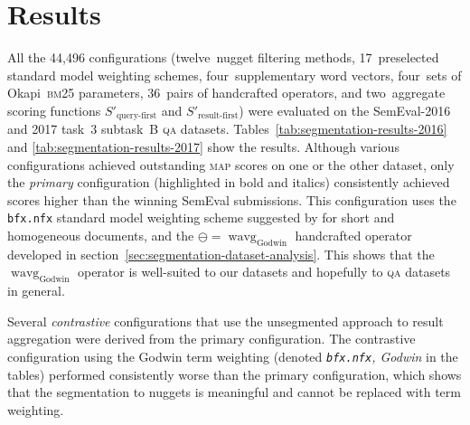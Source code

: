 \documentclass[
  digital, %
  notable, %
  lof,     %
  lot,     %
  nopalatino, color
]{fithesis3}
\newcommand{\op}[1]{\ensuremath{\operatorname{#1}}}
\newcommand{\wavg}{\op{wavg}}
\def\abbr#1{\textsc{\MakeLowercase{#1}}}
\let\term\emph
\let\emph=\textit
\begin{document}
\section{Results}
\label{sec:segmentation-results}
All the 44,496 configurations (twelve~nugget filtering
methods, 17~preselected standard model weighting
schemes, four~supplementary word vectors, four~sets of
Okapi~\abbr{BM}25 parameters\index{Okapi \abbr{BM}25}, 36~pairs of handcrafted
operators, and two~aggregate scoring functions
$S'_{\textrm{query-first}}$ and $S'_{\textrm{result-first}}$) were evaluated on the
SemEval-2016 and 2017 task~3 subtask~B \abbr{QA} datasets.
Tables~\ref{tab:segmentation-results-2016} and \ref{tab:segmentation-results-2017} show the results.
Although various configurations achieved outstanding \abbr{MAP} scores on one
or the other dataset, only the \term{primary} configuration (highlighted in
bold and italics) consistently achieved scores higher than the winning SemEval
submissions. This configuration uses the \texttt{bfx.nfx} standard model
weighting scheme suggested by \textcite{ml:SaltonBuckley1988}
for short and homogeneous documents, and the
$\ominus=\wavg_{\textrm{Godwin}}$\index{.wavgGodwin@$\wavg_{\textrm{Godwin}}$}%
 handcrafted operator developed in
section~\ref{sec:segmentation-dataset-analysis}.  This shows that the
$\wavg_{\textrm{Godwin}}$ operator is well-suited to our datasets and hopefully
to \abbr{QA} datasets in general.

Several \term{contrastive} configurations that use the unsegmented approach to
result aggregation were derived from the primary configuration. The contrastive
configuration using the Godwin term weighting
(denoted \term{\texttt{bfx.nfx}, Godwin} in the tables) performed consistently
worse than the primary configuration, which shows that the segmentation to
nuggets is meaningful and cannot be replaced with term weighting.
\end{document}
